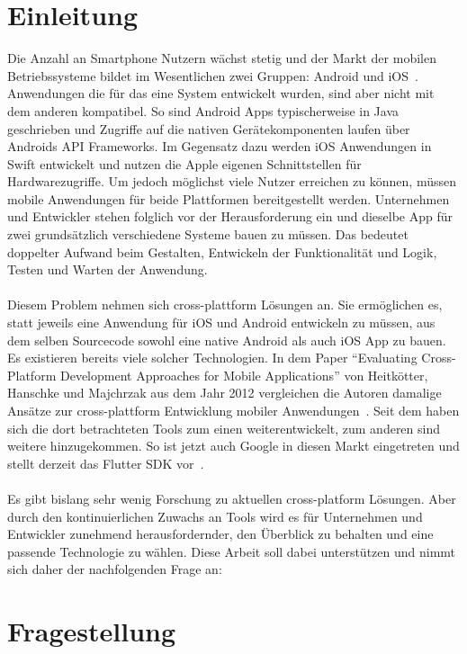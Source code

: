 \section*{Einleitung}

Die Anzahl an Smartphone Nutzern wächst stetig und der Markt der mobilen Betriebssysteme bildet im Wesentlichen zwei Gruppen: Android und iOS~\cite{statista}.
Anwendungen die für das eine System entwickelt wurden, sind aber nicht mit dem anderen kompatibel.
So sind Android Apps typischerweise in Java geschrieben und Zugriffe auf die nativen Gerätekomponenten laufen über Androids API Frameworks.
Im Gegensatz dazu werden iOS Anwendungen in Swift entwickelt und nutzen die Apple eigenen Schnittstellen für Hardwarezugriffe.
Um jedoch möglichst viele Nutzer erreichen zu können, müssen mobile Anwendungen für beide Plattformen bereitgestellt werden. Unternehmen und Entwickler stehen folglich vor der Herausforderung ein und dieselbe App für zwei grundsätzlich verschiedene Systeme bauen zu müssen.
Das bedeutet doppelter Aufwand beim Gestalten, Entwickeln der Funktionalität und Logik, Testen und Warten der Anwendung. \\ \\
Diesem Problem nehmen sich cross-plattform Lösungen an. Sie ermöglichen es, statt jeweils eine Anwendung für iOS und Android entwickeln zu müssen, aus dem selben Sourcecode sowohl eine native Android als auch iOS App zu bauen.
Es existieren bereits viele solcher Technologien. In dem Paper “Evaluating Cross-Platform Development Approaches for Mobile Applications” von Heitkötter, Hanschke und Majchrzak aus dem Jahr 2012 vergleichen die Autoren damalige Ansätze zur cross-plattform Entwicklung mobiler Anwendungen~\cite{eva12}.
Seit dem haben sich die dort betrachteten Tools zum einen weiterentwickelt, zum anderen sind weitere hinzugekommen. So ist jetzt auch Google in diesen Markt eingetreten und stellt derzeit das Flutter SDK vor~\cite{flutter}. \\ \\
Es gibt bislang sehr wenig Forschung zu aktuellen cross-platform Lösungen. Aber durch den kontinuierlichen Zuwachs an Tools wird es für Unternehmen und Entwickler zunehmend herausfordernder, den Überblick zu behalten und eine passende Technologie zu wählen. Diese Arbeit soll dabei unterstützen und nimmt sich daher der nachfolgenden Frage an:

\section*{Fragestellung}

